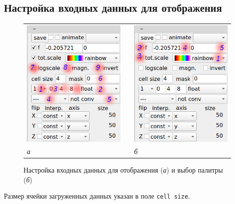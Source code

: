 \documentclass[12pt]{article}
\begin{document}
\subsection{Настройка входных данных для отображения}
\begin{figure}[h]
  \begin{center}
    \begin{tabular}{lll}
      \includegraphics[width=.28\textwidth]{picts/access.png} && \includegraphics[width=.28\textwidth]{picts/pal.png} \\
      \it а && \it б
    \end{tabular}
  \end{center}
  \caption{Настройка входных данных для отображения ({\it а}) и выбор палитры ({\it б})}\label{access:pict}
\end{figure}


Размер ячейки загруженных данных указан в поле \verb'cell size'. 
\end{document}

